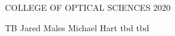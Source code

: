 \documentclass[dissertation,CC-BY-ND]{uathesis}
\begin{document}
\maketitlepage
{COLLEGE OF OPTICAL SCIENCES} %
{2020}	

\approval
{TB}		%
{Jared Males}	%
{Michael Hart}		%
{tbd}
{tbd}

\statementbyauthor



\tableofcontents

\listoffigures

\listoftables










\renewcommand{\baselinestretch}{1}		%
\small\normalsize						%

  

\end{document}

